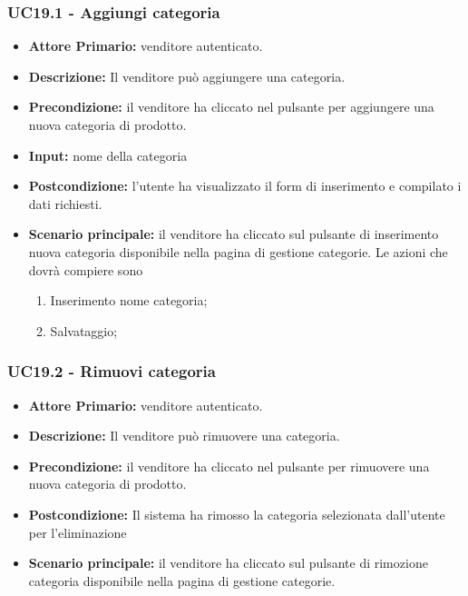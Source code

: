 \subsubsection{UC19.1 - Aggiungi categoria}
\begin{itemize}
    \item \textbf{Attore Primario:}  venditore autenticato.
    \item \textbf{Descrizione:}  Il venditore può aggiungere una categoria.
    \item \textbf{Precondizione:} il venditore ha cliccato nel pulsante per aggiungere una nuova categoria di prodotto.
    \item \textbf{Input:} nome della categoria
    \item \textbf{Postcondizione:} l’utente ha visualizzato il form di inserimento e compilato i dati richiesti.
    \item \textbf{Scenario principale:} il venditore ha cliccato sul pulsante di inserimento nuova categoria disponibile nella pagina di gestione categorie.  Le azioni che dovrà compiere sono
    \begin{enumerate}
        \item Inserimento nome categoria;
        \item Salvataggio;
    \end{enumerate}
\end{itemize}

\subsubsection{UC19.2 - Rimuovi categoria}
\begin{itemize}
    \item \textbf{Attore Primario:}  venditore autenticato.
    \item \textbf{Descrizione:}  Il venditore può rimuovere una categoria.
    \item \textbf{Precondizione:} il venditore ha cliccato nel pulsante per rimuovere una nuova categoria di prodotto.
    \item \textbf{Postcondizione:} Il sistema ha rimosso la categoria selezionata dall'utente per l'eliminazione
    \item \textbf{Scenario principale:} il venditore ha cliccato sul pulsante di rimozione categoria disponibile nella pagina di gestione categorie. 
 
\end{itemize}





